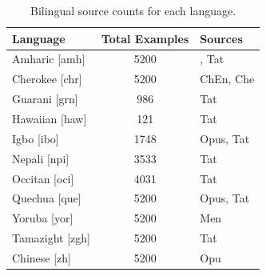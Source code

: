 \begin{table}[h!]
    \small
    \centering
        \begin{tabular}{l c l}
            \toprule
            \textbf{Language} & \textbf{Total Examples} & \textbf{Sources} \\
            \midrule
            Amharic [amh] & 5200 & , Tat \\
            Cherokee [chr] & 5200 & ChEn, Che \\
            Guarani [grn] & 986 & Tat \\
            Hawaiian [haw] & 121 & Tat \\
            Igbo [ibo] & 1748 & Opus, Tat \\
            Nepali [npi] & 3533 & Tat \\
            Occitan [oci] & 4031 & Tat \\
            Quechua [que] & 5200 & Opus, Tat \\
            Yoruba [yor] & 5200 & Men \\
            Tamazight [zgh] & 5200 & Tat \\
            Chinese [zh] & 5200 & Opu \\
            \bottomrule
        \end{tabular}
    \caption{Bilingual source counts for each language.}
    \label{tab:bi_source_counts}
\end{table}
